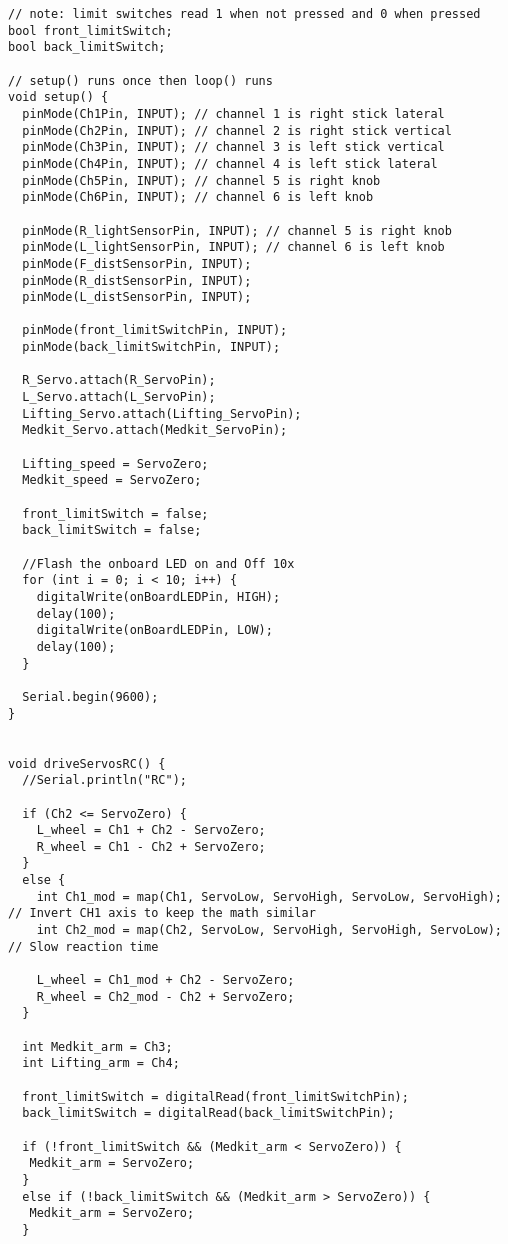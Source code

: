 \begin{lstlisting}[style=myArduino]
// note: limit switches read 1 when not pressed and 0 when pressed
bool front_limitSwitch;
bool back_limitSwitch;

// setup() runs once then loop() runs
void setup() {
  pinMode(Ch1Pin, INPUT); // channel 1 is right stick lateral
  pinMode(Ch2Pin, INPUT); // channel 2 is right stick vertical
  pinMode(Ch3Pin, INPUT); // channel 3 is left stick vertical
  pinMode(Ch4Pin, INPUT); // channel 4 is left stick lateral
  pinMode(Ch5Pin, INPUT); // channel 5 is right knob
  pinMode(Ch6Pin, INPUT); // channel 6 is left knob

  pinMode(R_lightSensorPin, INPUT); // channel 5 is right knob
  pinMode(L_lightSensorPin, INPUT); // channel 6 is left knob
  pinMode(F_distSensorPin, INPUT);
  pinMode(R_distSensorPin, INPUT);
  pinMode(L_distSensorPin, INPUT);

  pinMode(front_limitSwitchPin, INPUT);
  pinMode(back_limitSwitchPin, INPUT);

  R_Servo.attach(R_ServoPin);
  L_Servo.attach(L_ServoPin);
  Lifting_Servo.attach(Lifting_ServoPin);
  Medkit_Servo.attach(Medkit_ServoPin);

  Lifting_speed = ServoZero;
  Medkit_speed = ServoZero;

  front_limitSwitch = false;
  back_limitSwitch = false;

  //Flash the onboard LED on and Off 10x 
  for (int i = 0; i < 10; i++) {
    digitalWrite(onBoardLEDPin, HIGH);
    delay(100);
    digitalWrite(onBoardLEDPin, LOW);
    delay(100);
  }

  Serial.begin(9600);
}


void driveServosRC() {
  //Serial.println("RC");
  
  if (Ch2 <= ServoZero) {
    L_wheel = Ch1 + Ch2 - ServoZero;
    R_wheel = Ch1 - Ch2 + ServoZero;
  }
  else {
    int Ch1_mod = map(Ch1, ServoLow, ServoHigh, ServoLow, ServoHigh); // Invert CH1 axis to keep the math similar
    int Ch2_mod = map(Ch2, ServoLow, ServoHigh, ServoHigh, ServoLow); // Slow reaction time

    L_wheel = Ch1_mod + Ch2 - ServoZero;
    R_wheel = Ch2_mod - Ch2 + ServoZero;
  }

  int Medkit_arm = Ch3; 
  int Lifting_arm = Ch4;

  front_limitSwitch = digitalRead(front_limitSwitchPin);
  back_limitSwitch = digitalRead(back_limitSwitchPin);

  if (!front_limitSwitch && (Medkit_arm < ServoZero)) {
   Medkit_arm = ServoZero;
  } 
  else if (!back_limitSwitch && (Medkit_arm > ServoZero)) {
   Medkit_arm = ServoZero;
  }


\end{lstlisting}
